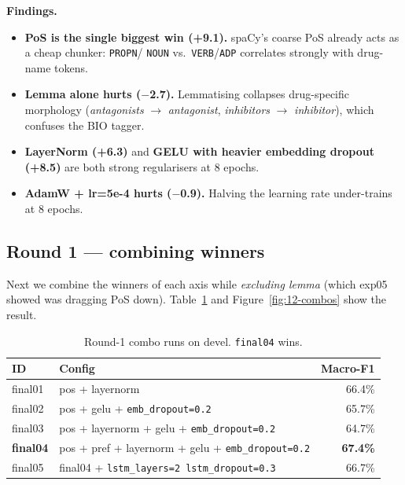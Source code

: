 \documentclass[a4paper,12pt]{article}
\begin{document}
\textbf{Findings.}
\begin{itemize}[nosep]
    \item \textbf{PoS is the single biggest win (+9.1).} spaCy's
    coarse PoS already acts as a cheap chunker: \texttt{PROPN}/
    \texttt{NOUN} vs.\ \texttt{VERB}/\texttt{ADP} correlates strongly
    with drug-name tokens.
    \item \textbf{Lemma alone hurts ($-$2.7).} Lemmatising collapses
    drug-specific morphology (\textit{antagonists} $\to$
    \textit{antagonist}, \textit{inhibitors} $\to$ \textit{inhibitor}),
    which confuses the BIO tagger.
    \item \textbf{LayerNorm (+6.3)} and \textbf{GELU with heavier
    embedding dropout (+8.5)} are both strong regularisers at 8
    epochs.
    \item \textbf{AdamW + lr=5e-4 hurts ($-$0.9).} Halving the learning
    rate under-trains at 8 epochs.
\end{itemize}

\subsection{Round 1 — combining winners}
\label{sec:12-combos}

Next we combine the winners of each axis while \emph{excluding lemma}
(which exp05 showed was dragging PoS down). Table~\ref{tab:12-combos}
and Figure~\ref{fig:12-combos} show the result.

\begin{table}[H]
\centering
\small
\begin{tabular}{l l r}
\hline
\textbf{ID} & \textbf{Config} & \textbf{Macro-F1} \\
\hline
final01 & pos + layernorm                                           & 66.4\% \\
final02 & pos + gelu + \texttt{emb\_dropout=0.2}                    & 65.7\% \\
final03 & pos + layernorm + gelu + \texttt{emb\_dropout=0.2}        & 64.7\% \\
\rowcolor{green!10} \textbf{final04} & pos + pref + layernorm + gelu + \texttt{emb\_dropout=0.2} & \textbf{67.4\%} \\
final05 & final04 + \texttt{lstm\_layers=2 lstm\_dropout=0.3}       & 66.7\% \\
\hline
\end{tabular}
\caption{Round-1 combo runs on devel. \texttt{final04} wins.}
\label{tab:12-combos}
\end{table}
\end{document}
